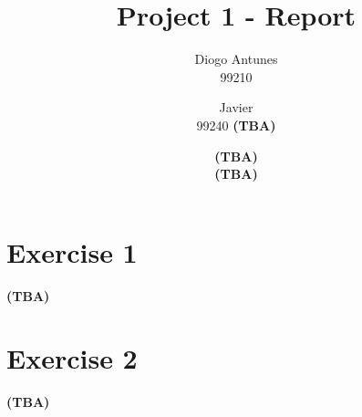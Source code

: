 \documentclass[12pt]{article}
\newcommand{\tba}{\textbf{(TBA) }}
\begin{document}
\title{Project 1 - Report}
\author{
  Diogo Antunes\\
  99210
  \and
  Javier\\
  99240
  \tba
  \and
  \tba\\
  \tba
}

\maketitle

\section*{Exercise 1}

\tba

\section*{Exercise 2}

\tba
\end{document}
